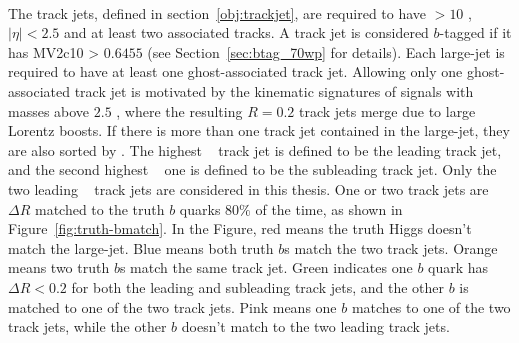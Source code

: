 \paragraph{}
The track jets, defined in section~\ref{obj:trackjet}, are required to have \pt $> 10$ \GeV, $|\eta| < 2.5$ and at least two associated tracks. 
A track jet is considered $b$-tagged if it has MV2c10 > $0.6455$ (see Section~\ref{sec:btag_70wp} for details).
Each large-\R jet is required to have at least one ghost-associated track jet.
Allowing only one ghost-associated track jet is motivated by the kinematic signatures of signals with masses above $2.5$ \TeV, where the resulting $R = 0.2$ track jets merge due to large Lorentz boosts.
If there is more than one track jet contained in the large-\R jet, they are also sorted by \pt.
The highest \pt~ track jet is defined to be the leading track jet, and the second highest \pt~ one is defined to be the subleading track jet.
Only the two leading \pt~ track jets are considered in this thesis.
One or two track jets are $\Delta R$ matched to the truth $b$ quarks $80\%$ of the time, as shown in Figure~\ref{fig:truth-bmatch}. 
In the Figure, red means the truth Higgs doesn't match the large-\R jet. 
Blue means both truth $b$s match the two track jets. 
Orange means two truth $b$s match the same track jet. 
Green indicates one $b$ quark has $\Delta R<0.2$ for both the leading and subleading track jets, and the other $b$ is matched to one of the two track jets. 
Pink means one $b$ matches to one of the two track jets, while the other $b$ doesn't match to the two leading track jets.

